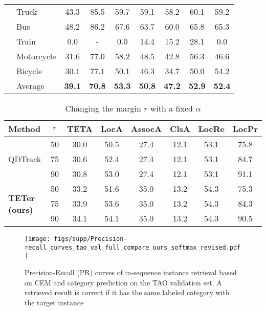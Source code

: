 \documentclass[runningheads]{llncs}
\begin{document}
\begin{table*}[t]
{\begin{tabular}{@{}l|l|ccc|cccc@{}}
&Truck &43.3 &85.5 &59.7 &59.1 &58.2 &60.1 &59.2 \\
&Bus &48.2 &86.2 &67.6 &63.7 &60.0 &65.8 &65.3 \\
&Train &0.0 &- &0.0 &14.4 &15.2 &28.1 &0.0 \\
&Motorcycle &31.6 &77.0 &58.2 &48.5 &42.8 &56.3 &46.6 \\
&Bicycle &30.1 &77.1 &50.1 &46.3 &34.7 &50.0 &54.2 \\
\cline{2-9} 
 & Average & \textbf{39.1} & \textbf{70.8} & \textbf{53.3} & \textbf{50.8} & \textbf{47.2} & \textbf{52.9} & \textbf{52.4} \\ \bottomrule
\end{tabular}}
\end{table*}


\begin{table}[t]
\centering
\caption{Changing the margin $r$ with a fixed $\alpha$}
\begin{tabular}{@{}l|c|cccccc@{}}

\hline
Method                         & $r$  & TETA   & LocA   & AssocA & ClsA & LocRe & LocPr    \\ \hline
\multirow{3}{*}{QDTrack}       & 50 & 30.0 & 50.5 & 27.4 & 12.1 & 53.1 & 75.8 \\
                               & 75 & 30.6 & 52.4 & 27.4 & 12.1 & 53.1 & 84.7 \\
                              & 90 & 30.8 & 53.0 & 27.4 & 12.1 & 53.1 & 91.1 \\ \hline
\multirow{3}{*}{\textbf{TETer (ours)}}  & 50 & 33.2 & 51.6 & 35.0 & 13.2 & 54.3 & 75.3 \\
                              & 75 & 33.9 & 53.6 & 35.0 & 13.2 & 54.3 & 84.3\\
                              & 90 & 34.1 & 54.1 & 35.0 & 13.2 & 54.3 & 90.5\\ \hline
\end{tabular}
\label{tab:fixa}
\end{table}


\begin{figure}[t]
	\centering
\texttt{[image: figs/supp/Precision-recall\_curves\_tao\_val\_full\_compare\_ours\_softmax\_revised.pdf]}
	\caption{Precision-Recall (PR) curves of in-sequence instance retrieval based on CEM and category prediction on the TAO validation set. A retrieved result is correct if it has the same labeled category with the target instance }
	\label{fig:PR_TAO_FULL}
\end{figure}
\end{document}
